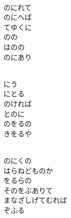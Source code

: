 \documentclass[10pt,b5j]{tarticle} %
\begin{document}
\vspace{1.5em} %
\newcommand{\linespace}{0.5em} %
\newcommand{\blocksize}{0.5\hsize} %
\newcommand{\itemmargin}{6em} %
\begin{enumerate} %
    \setlength{\itemindent}{\itemmargin} %
    \begin{minipage}[c]{\blocksize}
    
        \vspace{\linespace}
        \item~\\
        のにれて\\
        のにへば\\
        てゆくに\\
        のの\\
        はのの\\
        のにあり
        
        \vspace{\linespace}
        \item~\\
        にう\\
        にとる\\
        のければ\\
        とのに\\
        のをるの\\
        きをるや
        
        \vspace{\linespace}
        \item~\\
        のにくの\\
        はらねどものか\\
        をるらの\\
        そのをぶありて\\
        まなざしげてむれば\\
        ぞふる
    
    \end{minipage}
\end{enumerate} %
\end{document}
